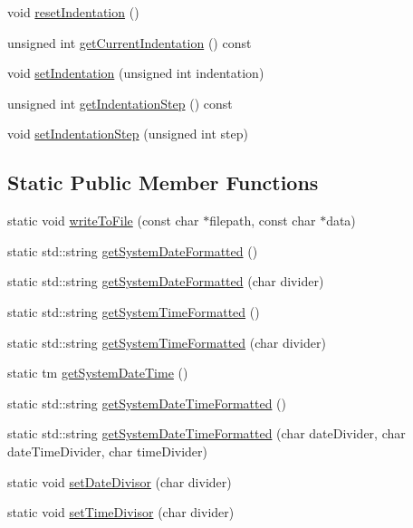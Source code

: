 \begin{DoxyCompactItemize}
\item 
void \mbox{\hyperlink{classutl_1_1_file_logger_a72a57d0ebcf5a721bc4fc0e4184fb99c}{reset\+Indentation}} ()
\item 
unsigned int \mbox{\hyperlink{classutl_1_1_file_logger_ad89c9413f97d6d0cc484281bf41bf1f9}{get\+Current\+Indentation}} () const
\item 
void \mbox{\hyperlink{classutl_1_1_file_logger_a7855d0b2cbd55a2162e55e862f928f6e}{set\+Indentation}} (unsigned int indentation)
\item 
unsigned int \mbox{\hyperlink{classutl_1_1_file_logger_a3193fb78297f90dfc58c12e2d95d9024}{get\+Indentation\+Step}} () const
\item 
void \mbox{\hyperlink{classutl_1_1_file_logger_a3757aa52e29ca1d336b6db0174e72a05}{set\+Indentation\+Step}} (unsigned int step)
\end{DoxyCompactItemize}
\subsection*{Static Public Member Functions}
\begin{DoxyCompactItemize}
\item 
static void \mbox{\hyperlink{classutl_1_1_file_logger_ac08928c13abec9fc8677ce286a382361}{write\+To\+File}} (const char $\ast$filepath, const char $\ast$data)
\item 
static std\+::string \mbox{\hyperlink{classutl_1_1_file_logger_a5bad9892d678f01ae8d1d98c9a9f4ac6}{get\+System\+Date\+Formatted}} ()
\item 
static std\+::string \mbox{\hyperlink{classutl_1_1_file_logger_afe095687333b2bcb91d636acd0eece70}{get\+System\+Date\+Formatted}} (char divider)
\item 
static std\+::string \mbox{\hyperlink{classutl_1_1_file_logger_aebdd2f1aa1ebc6c08854b457f81c122e}{get\+System\+Time\+Formatted}} ()
\item 
static std\+::string \mbox{\hyperlink{classutl_1_1_file_logger_ae027b2a04cafb8f9a76f05cfd908c8d6}{get\+System\+Time\+Formatted}} (char divider)
\item 
static tm \mbox{\hyperlink{classutl_1_1_file_logger_a47723f9d9d3fa52593ab169d8e7d573a}{get\+System\+Date\+Time}} ()
\item 
static std\+::string \mbox{\hyperlink{classutl_1_1_file_logger_ab9641328b5d0677fc926c17da370703d}{get\+System\+Date\+Time\+Formatted}} ()
\item 
static std\+::string \mbox{\hyperlink{classutl_1_1_file_logger_a7f97df31f01c10c1918ac6060701eb17}{get\+System\+Date\+Time\+Formatted}} (char date\+Divider, char date\+Time\+Divider, char time\+Divider)
\item 
static void \mbox{\hyperlink{classutl_1_1_file_logger_adbb5c7f8b254620da346ba057d792c8e}{set\+Date\+Divisor}} (char divider)
\item 
static void \mbox{\hyperlink{classutl_1_1_file_logger_a51ad4d53ee5067f38fe9ae665b87f98c}{set\+Time\+Divisor}} (char divider)
\end{DoxyCompactItemize}


